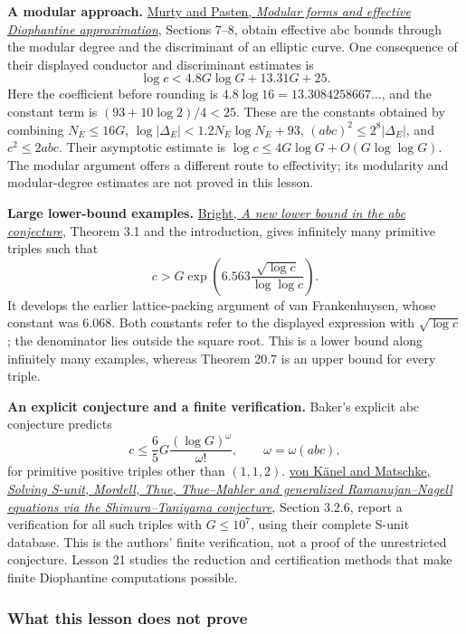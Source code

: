 \documentclass[
  11pt,
  a4paper,
]{article}
\begin{document}
\textbf{A modular approach.}
\href{https://people.math.harvard.edu/~hpasten/preprints/modabcJNT.pdf}{Murty
and Pasten, \emph{Modular forms and effective Diophantine
approximation}}, Sections 7--8, obtain effective abc bounds through the
modular degree and the discriminant of an elliptic curve. One
consequence of their displayed conductor and discriminant estimates is
\[
 \log c<4.8G\log G+13.31G+25.
\] Here the coefficient before rounding is
\(4.8\log16=13.3084258667\ldots\), and the constant term is
\((93+10\log2)/4<25\). These are the constants obtained by combining
\(N_E\le16G\), \(\log|\Delta_E|<1.2N_E\log N_E+93\),
\((abc)^2\le2^8|\Delta_E|\), and \(c^2\le2abc\). Their asymptotic
estimate is \(\log c\le4G\log G+O(G\log\log G)\). The modular argument
offers a different route to effectivity; its modularity and
modular-degree estimates are not proved in this lesson.

\textbf{Large lower-bound examples.}
\href{https://arxiv.org/pdf/2301.11056}{Bright, \emph{A new lower bound
in the abc conjecture}}, Theorem 3.1 and the introduction, gives
infinitely many primitive triples such that \[
 c>G\exp\left(6.563\frac{\sqrt{\log c}}{\log\log c}\right).
\] It develops the earlier lattice-packing argument of van
Frankenhuysen, whose constant was \(6.068\). Both constants refer to the
displayed expression with \(\sqrt{\log c}\); the denominator lies
outside the square root. This is a lower bound along infinitely many
examples, whereas Theorem 20.7 is an upper bound for every triple.

\textbf{An explicit conjecture and a finite verification.} Baker's
explicit abc conjecture predicts \[
 c\le\frac65 G\frac{(\log G)^\omega}{\omega!},
 \qquad \omega=\omega(abc),
\] for primitive positive triples other than \((1,1,2)\).
\href{https://arxiv.org/pdf/1605.06079}{von Känel and Matschke,
\emph{Solving S-unit, Mordell, Thue, Thue--Mahler and generalized
Ramanujan--Nagell equations via the Shimura--Taniyama conjecture}},
Section 3.2.6, report a verification for all such triples with
\(G\le10^7\), using their complete S-unit database. This is the authors'
finite verification, not a proof of the unrestricted conjecture. Lesson
21 studies the reduction and certification methods that make finite
Diophantine computations possible.

\subsubsection{What this lesson does not
prove}\label{what-this-lesson-does-not-prove}
\end{document}
